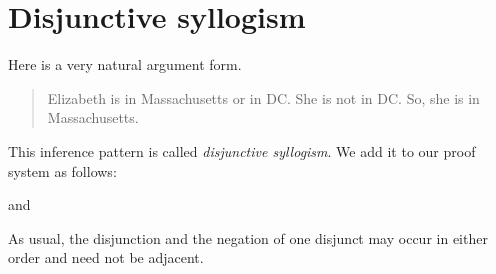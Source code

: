 %
%
%
%
%




\section{Disjunctive syllogism}
Here is a very natural argument form.
	\begin{quote}
		Elizabeth is in Massachusetts or in DC. She is not in DC. So, she is in Massachusetts.
	\end{quote}
This inference pattern is called \emph{disjunctive syllogism}. We add it to our proof system as follows:
\begin{highlighted}\begin{fitchproof}
\end{fitchproof}\end{highlighted}
and
\begin{highlighted}\begin{fitchproof}
\end{fitchproof}\end{highlighted}
As usual, the disjunction and the negation of one disjunct may occur in either order and need not be adjacent.

